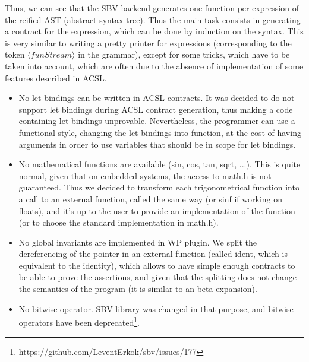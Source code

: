 \documentclass[a4paper,11pt,final]{article}
\begin{document}
	Thus, we can see that the SBV backend generates one function per expression of the reified AST (abstract syntax tree). Thus the main task consists in generating a contract for the expression, which can be done by induction on the syntax. This is very similar to writing a pretty printer for expressions (corresponding to the token $\langle funStream \rangle$ in the grammar), except for some tricks, which have to be taken into account, which are often due to the absence of implementation of some features described in ACSL.
	
	\begin{itemize}
		\item No let bindings can be written in ACSL contracts.
		\subitem It was decided to do not support let bindings during ACSL contract generation, thus making a code containing let bindings unprovable. Nevertheless, the programmer can use a functional style, changing the let bindings into function, at the cost of having arguments in order to use variables that should be in scope for let bindings.
		\item No mathematical functions are available (sin, cos, tan, sqrt, ...).
		\subitem This is quite normal, given that on embedded systems, the access to math.h is not guaranteed. Thus we decided to transform each trigonometrical function into a call to an external function, called the same way (or sinf if working on floats), and it's up to the user to provide an implementation of the function (or to choose the standard implementation in math.h).
		\item No global invariants are implemented in WP plugin.
		\subitem We split the dereferencing of the pointer in an external function (called ident, which is equivalent to the identity), which allows to have simple enough contracts to be able to prove the assertions, and given that the splitting does not change the semantics of the program (it is similar to an beta-expansion).
		\item No bitwise operator.
		\subitem SBV library was changed in that purpose, and bitwise operators have been deprecated\footnote{https://github.com/LeventErkok/sbv/issues/177}.
	\end{itemize}
	
\end{document}
